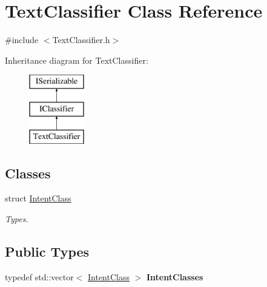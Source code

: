 \hypertarget{class_text_classifier}{}\section{Text\+Classifier Class Reference}
\label{class_text_classifier}


{\ttfamily \#include $<$Text\+Classifier.\+h$>$}

Inheritance diagram for Text\+Classifier\+:\begin{figure}[H]
\begin{center}
\leavevmode
\includegraphics[height=3.000000cm]{class_text_classifier}
\end{center}
\end{figure}
\subsection*{Classes}
\begin{DoxyCompactItemize}
\item 
struct \hyperlink{struct_text_classifier_1_1_intent_class}{Intent\+Class}
\begin{DoxyCompactList}\small\item\em Types. \end{DoxyCompactList}\end{DoxyCompactItemize}
\subsection*{Public Types}
\begin{DoxyCompactItemize}
\item 
\mbox{\label{class_text_classifier_ac1a536e38ec147b8936984b3ce7aa436}} 
typedef std\+::vector$<$ \hyperlink{struct_text_classifier_1_1_intent_class}{Intent\+Class} $>$ {\bfseries Intent\+Classes}
\end{DoxyCompactItemize}
